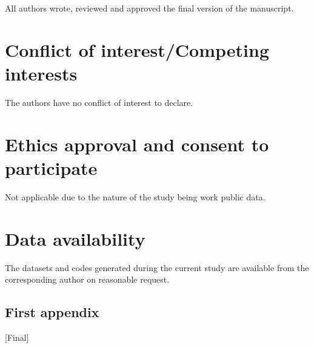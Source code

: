 \documentclass[pdflatex,sn-mathphys-num]{sn-jnl}
\theoremstyle{thmstyleone}%
\theoremstyle{thmstyletwo}%
\theoremstyle{thmstylethree}%
\begin{document}
All authors wrote, reviewed and approved the final version of the manuscript.

\section*{Conflict of interest/Competing interests}
The authors have no conflict of interest to declare.

\section*{Ethics approval and consent to participate}
Not applicable due to the nature of the study being work public data.

\section*{Data availability}
The datasets and codes generated during the current study are available from the corresponding author on reasonable
request.

\newpage
\begin{appendices}

\section{First appendix}\label{secA1}

[Final]

\end{appendices}


\newpage

\end{document}
